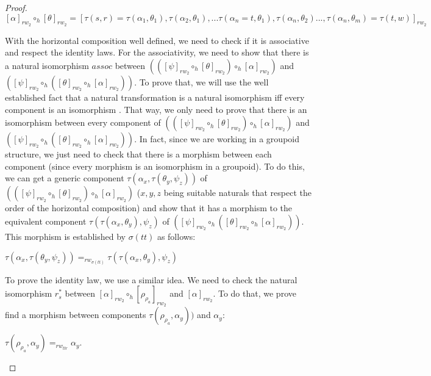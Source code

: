 \documentclass[12pt, a4paper,  oneside, headinclude,footinclude, BCOR5mm]{scrartcl}
\begin{document}
\begin{proof}
$[\alpha]_{rw_{2}} \circ_{h} [\theta]_{rw_{2}} = [\tau(s,r) = \tau(\alpha_{1},\theta_{1}), \tau(\alpha_{2}, \theta_{1}), ... \tau(\alpha_{n} = t,\theta_{1}), \tau(\alpha_{n}, \theta_{2}) ... ,\tau(\alpha_{n}, \theta_{m}) = \tau(t,w)]_{rw_{2}}$

With the horizontal composition well defined, we need to check if it is associative and respect the identity laws. For the associativity, we need to show that there is a natural isomorphism $assoc$ between $(([\psi]_{rw_{2}} \circ_{h} [\theta]_{rw_{2}}) \circ_{h} [\alpha]_{rw_{2}})$ and  $([\psi]_{rw_{2}} \circ_{h} ([\theta]_{rw_{2}} \circ_{h} [\alpha]_{rw_{2}}))$. To prove that, we will use the well established fact that a natural transformation is a natural isomorphism iff every component is an isomorphism \cite{Steve2}. That way, we only need to prove that there is an isomorphism between every component of $(([\psi]_{rw_{2}} \circ_{h} [\theta]_{rw_{2}}) \circ_{h} [\alpha]_{rw_{2}})$ and  $([\psi]_{rw_{2}} \circ_{h} ([\theta]_{rw_{2}} \circ_{h} [\alpha]_{rw_{2}}))$. In fact, since we are working in a groupoid structure, we just need to check that there is a morphism between each component (since every morphism is an isomorphism in a groupoid). To do this, we can get a generic component $\tau(\alpha_{x}, \tau(\theta_{y}, \psi_{z}))$ of  $(([\psi]_{rw_{2}} \circ_{h} [\theta]_{rw_{2}}) \circ_{h} [\alpha]_{rw_{2}})$ ($x, y, z$ being suitable naturals that respect the order of the horizontal composition) and show that it has a morphism to the equivalent component $\tau(\tau(\alpha_{x},\theta_{y}), \psi_{z})$ of  $([\psi]_{rw_{2}} \circ_{h} ([\theta]_{rw_{2}} \circ_{h} [\alpha]_{rw_{2}}))$. This morphism is established by $\sigma(tt)$ as follows:

\begin{center}
$\tau(\alpha_{x}, \tau(\theta_{y}, \psi_{z})) =_{rw_{\sigma(tt)}} \tau(\tau(\alpha_{x},\theta_{y}), \psi_{z})$
\end{center}

To prove the identity law, we use a similar idea. We need to check the natural isomorphism  $r^{*}_{s}$ between  $[\alpha]_{rw_{2}} \circ_{h} [\rho_{\rho_{a}}]_{rw_{2}}$  and $[\alpha]_{rw_{2}}$. To do that, we prove find a morphism between components $\tau(\rho_{\rho_{a}}, \alpha_{y}))$ and $\alpha_{y}$:

\begin{center}
$\tau(\rho_{\rho_{a}}, \alpha_{y}) =_{rw_{tlr}} \alpha_{y}$.
\end{center}


\end{proof}
\end{document}
